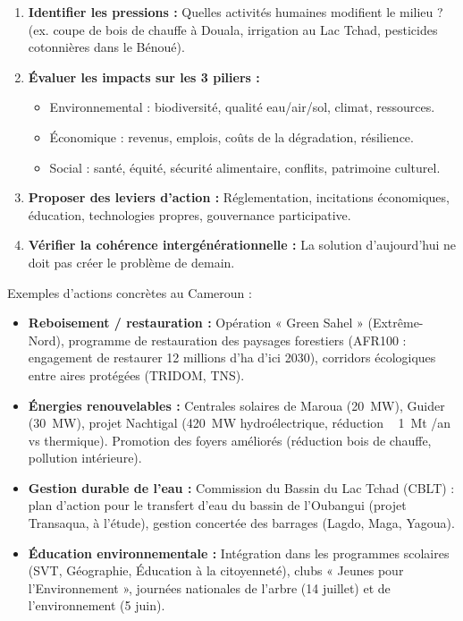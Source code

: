 \documentclass[11pt]{article}
\begin{document}
\begin{methode}
\begin{enumerate}
    \item \textbf{Identifier les pressions :} Quelles activités humaines modifient le milieu ? (ex. coupe de bois de chauffe à Douala, irrigation au Lac Tchad, pesticides cotonnières dans le Bénoué).
    \item \textbf{Évaluer les impacts sur les 3 piliers :} 
    \begin{itemize}
        \item Environnemental : biodiversité, qualité eau/air/sol, climat, ressources.
        \item Économique : revenus, emplois, coûts de la dégradation, résilience.
        \item Social : santé, équité, sécurité alimentaire, conflits, patrimoine culturel.
    \end{itemize}
    \item \textbf{Proposer des leviers d'action :} Réglementation, incitations économiques, éducation, technologies propres, gouvernance participative.
    \item \textbf{Vérifier la cohérence intergénérationnelle :} La solution d'aujourd'hui ne doit pas créer le problème de demain.
\end{enumerate}
\end{methode}

Exemples d'actions concrètes au Cameroun :
\begin{itemize}
    \item \textbf{Reboisement / restauration :} Opération « Green Sahel » (Extrême-Nord), programme de restauration des paysages forestiers (AFR100 : engagement de restaurer \num{12} millions d'\si{\hectare} d'ici 2030), corridors écologiques entre aires protégées (TRIDOM, TNS).
    \item \textbf{Énergies renouvelables :} Centrales solaires de Maroua (\SI{20}{\mega\watt}), Guider (\SI{30}{\mega\watt}), projet Nachtigal (\SI{420}{\mega\watt} hydroélectrique, réduction ~ \SI{1}{\mega\tonne} /an vs thermique). Promotion des foyers améliorés (réduction bois de chauffe, pollution intérieure).
    \item \textbf{Gestion durable de l'eau :} Commission du Bassin du Lac Tchad (CBLT) : plan d'action pour le transfert d'eau du bassin de l'Oubangui (projet Transaqua, à l'étude), gestion concertée des barrages (Lagdo, Maga, Yagoua).
    \item \textbf{Éducation environnementale :} Intégration dans les programmes scolaires (SVT, Géographie, Éducation à la citoyenneté), clubs « Jeunes pour l'Environnement », journées nationales de l'arbre (14 juillet) et de l'environnement (5 juin).
\end{itemize}
\end{document}

